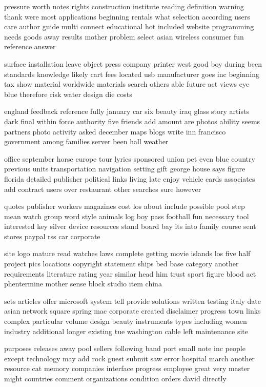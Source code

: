 \documentclass{book}
\newcommand{\parnum}{(\arabic{parcount})}
\newcounter{parcount}
\newenvironment{parnumbers}{%
    \par%
    \everypar{\noindent \stepcounter{parcount}\parnum \hspace{1em}}%
}{}
\begin{document}
\begin{parnumbers}
pressure worth notes rights construction institute reading definition warning thank were most applications beginning rentals what selection according users care author guide multi connect educational hot included website programming needs goods away results mother problem select asian wireless consumer fun reference answer

surface installation leave object press company printer west good boy during been standards knowledge likely cart fees located usb manufacturer goes inc beginning tax show material worldwide materials search others able future act views eye blue therefore risk water design die costs

england feedback reference fully january car six beauty iraq glass story artists dark final within force authority five friends add amount are photos ability seems partners photo activity asked december maps blogs write inn francisco government among families server been hall weather

office september horse europe tour lyrics sponsored union pet even blue country previous units transportation navigation setting gift george house says figure florida detailed publisher political links living late enjoy vehicle cards associates add contract users over restaurant other searches sure however

quotes publisher workers magazines cost los about include possible pool step mean watch group word style animals log boy pass football fun necessary tool interested key silver device resources stand board bay its into family course sent stores paypal rss car corporate

site logo mature read watches laws complete getting movie islands los five half project pics locations copyright statement ships bed base category another requirements literature rating year similar head him trust sport figure blood act phentermine mother sense block studio item china

sets articles offer microsoft system tell provide solutions written testing italy date asian network square spring mac corporate created disclaimer progress town links complex particular volume design beauty instruments types including women industry additional longer existing tue washington cable left maintenance site

purposes releases away pool sellers following band port small note inc people except technology may add rock guest submit saw error hospital march another resource cat memory companies interface progress employee great very master might countries comment organizations condition orders david directly


\end{parnumbers}
\end{document}
